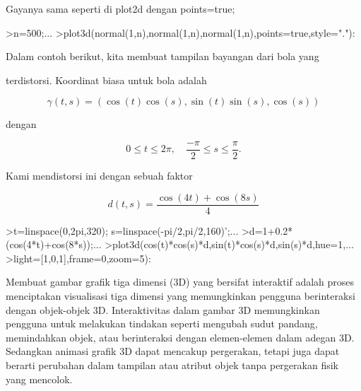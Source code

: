 \documentclass[a4paper,10pt]{article}
\begin{document}
\begin{eulernotebook}
\begin{eulercomment}
\begin{eulercomment}
\begin{eulercomment}
\begin{eulercomment}
\begin{eulercomment}
\begin{eulercomment}
\begin{eulercomment}
\begin{eulercomment}
\begin{eulercomment}
\begin{eulercomment}
\begin{eulercomment}
\begin{eulercomment}
\begin{eulercomment}
Gayanya sama seperti di plot2d dengan points=true;
\end{eulercomment}
\begin{eulerprompt}
>n=500;...
>plot3d(normal(1,n),normal(1,n),normal(1,n),points=true,style="."):
\end{eulerprompt}
\begin{eulercomment}
\end{eulercomment}
\begin{eulerttcomment}
 Dalam contoh berikut, kita membuat tampilan bayangan dari bola yang
\end{eulerttcomment}
\begin{eulercomment}
terdistorsi. Koordinat biasa untuk bola adalah

\end{eulercomment}
\begin{eulerformula}
\[
\gamma(t,s) = (\cos(t)\cos(s),\sin(t)\sin(s),\cos(s))
\]
\end{eulerformula}
\begin{eulercomment}
dengan

\end{eulercomment}
\begin{eulerformula}
\[
0 \le t \le 2\pi, \quad \frac{-\pi}{2} \le s \le \frac{\pi}{2}.
\]
\end{eulerformula}
\begin{eulercomment}
Kami mendistorsi ini dengan sebuah faktor

\end{eulercomment}
\begin{eulerformula}
\[
d(t,s) = \frac{\cos(4t)+\cos(8s)}{4}
\]
\end{eulerformula}
\begin{eulerprompt}
>t=linspace(0,2pi,320); s=linspace(-pi/2,pi/2,160)';...
>d=1+0.2*(cos(4*t)+cos(8*s));...
>plot3d(cos(t)*cos(s)*d,sin(t)*cos(s)*d,sin(s)*d,hue=1,...
>light=[1,0,1],frame=0,zoom=5):
\end{eulerprompt}
\begin{eulercomment}
Membuat gambar grafik tiga dimensi (3D) yang bersifat interaktif
adalah proses menciptakan visualisasi tiga dimensi yang memungkinkan
pengguna berinteraksi dengan objek-objek 3D. Interaktivitas dalam
gambar 3D memungkinkan pengguna untuk melakukan tindakan seperti
mengubah sudut pandang, memindahkan objek, atau berinteraksi dengan
elemen-elemen dalam adegan 3D. Sedangkan animasi grafik 3D dapat
mencakup pergerakan, tetapi juga dapat berarti perubahan dalam
tampilan atau atribut objek tanpa pergerakan fisik yang mencolok.


\end{eulercomment}
\end{eulercomment}
\end{eulercomment}
\end{eulercomment}
\end{eulercomment}
\end{eulercomment}
\end{eulercomment}
\end{eulercomment}
\end{eulercomment}
\end{eulercomment}
\end{eulercomment}
\end{eulercomment}
\end{eulercomment}
\end{eulernotebook}
\end{document}
